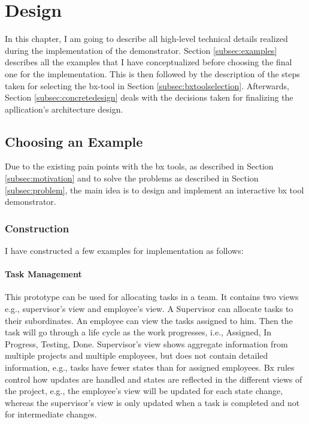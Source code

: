 \section{Design}\label{sec:design}
In this chapter, I am going to describe all high-level technical details realized during the implementation of the demonstrator. Section \ref{subsec:examples} describes all the examples that I have conceptualized before choosing the final one for the implementation. This is then followed by
the description of the steps taken for selecting the bx-tool in Section \ref{subsec:bxtoolselection}. Afterwards, Section \ref{subsec:concretedesign} deals with the decisions taken for finalizing the apllication's architecture design.
\subsection{Choosing an Example}\label{subsec:exampleforimplementation}
Due to the existing pain points with the bx tools, as described in Section \ref{subsec:motivation} and to solve the problems as described in Section \ref{subsec:problem}, the main idea is to design and implement an interactive bx tool demonstrator.
\subsubsection{Construction}\label{subsubsec:exampleconstruction}
I have constructed a few examples for implementation as follows:
\paragraph{Task Management} This prototype can be used for allocating tasks in a team. It contains two views e.g., supervisor's view and employee's view. A Supervisor can allocate tasks to their subordinates. An employee can view the tasks assigned to him. Then the task will go through a life cycle as the work progresses, i.e., Assigned, In Progress, Testing, Done. Supervisor's view shows aggregate information from multiple projects and multiple employees, but does not contain detailed information, e.g., tasks have fewer states than for assigned employees. Bx rules control how updates are handled and states are reflected in the different views of the project, e.g., the employee's view will be updated for each state change, whereas the supervisor's view is only updated when a task is completed and not for intermediate changes.

